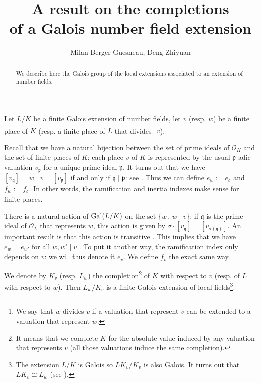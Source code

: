 \documentclass[12pt,a4paper,english]{article}
\title{A result on the completions\\ of a Galois number field extension}
\author{Milan Berger-Guesneau, Deng Zhiyuan}
\theoremstyle{definition}
\theoremstyle{plain}
\begin{document}
\maketitle

\begin{abstract}
We describe here the Galois group of the local extensions associated to an extension of number fields.
\end{abstract}
\vspace{0.5cm}

Let $L/K$ be a finite Galois extension of number fields, let $v$ (resp. $w$) be a finite place of $K$ (resp. a finite place of $L$ that divides\footnote{We say that $w$ divides $v$ if a valuation that represent $v$ can be extended to a valuation that represent $w$.} $v$).

Recall that we have a natural bijection between the set of prime ideals of $\mathcal{O}_K$ and the set of finite places of $K$: each place $v$ of $K$ is represented by the usual $\mathfrak{p}$-adic valuation $v_\mathfrak{p}$ for a unique prime ideal $\mathfrak{p}$. It turns out that we have $[v_\mathfrak{q}]=w\mid v=[v_\mathfrak{p}]$ if and only if $\mathfrak{q}\mid \mathfrak{p}$: see \cite[p.15]{clserre}. Thus we can define $e_w:=e_\mathfrak{q}$ and $f_w:=f_\mathfrak{q}$. In other words, the ramification and inertia indexes make sense for finite places.
\vspace{0.5cm}

There is a natural action of $\text{\normalfont{Gal}}(L/K)$ on the set $\{w\,,\, w\mid v\}$: if $\mathfrak{q}$ is the prime ideal of $\mathcal{O}_L$ that represents $w$, this action is given by $\sigma\cdot [v_\mathfrak{q}]=[v_{\sigma (\mathfrak{q})}]$. An important result is that this action is transitive \cite[p.167]{neukirch}. This implies that we have $e_w=e_{w'}$ for all $w,w'\mid v$ \cite[p.55]{neukirch}. To put it another way, the ramification index only depends on $v$: we will thus denote it $e_v$. We define $f_v$ the exact same way.
\vspace{0.5cm}

We denote by $K_v$ (resp. $L_w$) the completion\footnote{It means that we complete $K$ for the absolute value induced by any valuation that represents $v$ (all those valuations induce the same completion).} of $K$ with respect to $v$ (resp. of $L$ with respect to $w$). Then $L_w/K_v$ is a finite Galois extension of local fields\footnote{The extension $L/K$ is Galois so $LK_v/K_v$ is also Galois. It turns out that $L K_v \cong L_w$ (see \cite[p.31]{clserre}).}.
\vspace{0.5cm}
\end{document}
